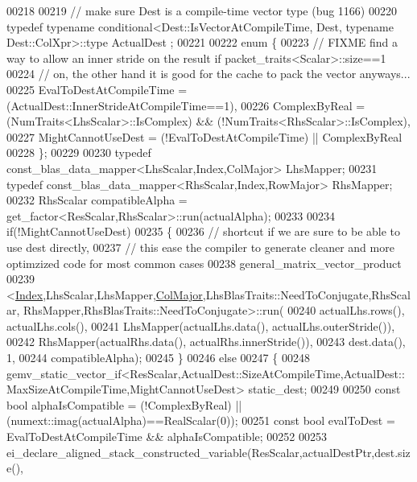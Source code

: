 \begin{DoxyCode}
00218 
00219     \textcolor{comment}{// make sure Dest is a compile-time vector type (bug 1166)}
00220     \textcolor{keyword}{typedef} \textcolor{keyword}{typename} conditional<Dest::IsVectorAtCompileTime, Dest, typename Dest::ColXpr>::type ActualDest
      ;
00221 
00222     \textcolor{keyword}{enum} \{
00223       \textcolor{comment}{// FIXME find a way to allow an inner stride on the result if packet\_traits<Scalar>::size==1}
00224       \textcolor{comment}{// on, the other hand it is good for the cache to pack the vector anyways...}
00225       EvalToDestAtCompileTime = (ActualDest::InnerStrideAtCompileTime==1),
00226       ComplexByReal = (NumTraits<LhsScalar>::IsComplex) && (!NumTraits<RhsScalar>::IsComplex),
00227       MightCannotUseDest = (!EvalToDestAtCompileTime) || ComplexByReal
00228     \};
00229 
00230     \textcolor{keyword}{typedef} const\_blas\_data\_mapper<LhsScalar,Index,ColMajor> LhsMapper;
00231     \textcolor{keyword}{typedef} const\_blas\_data\_mapper<RhsScalar,Index,RowMajor> RhsMapper;
00232     RhsScalar compatibleAlpha = get\_factor<ResScalar,RhsScalar>::run(actualAlpha);
00233 
00234     \textcolor{keywordflow}{if}(!MightCannotUseDest)
00235     \{
00236       \textcolor{comment}{// shortcut if we are sure to be able to use dest directly,}
00237       \textcolor{comment}{// this ease the compiler to generate cleaner and more optimzized code for most common cases}
00238       general\_matrix\_vector\_product
00239           <\hyperlink{namespace_eigen_a62e77e0933482dafde8fe197d9a2cfde}{Index},LhsScalar,LhsMapper,\hyperlink{group__enums_ggaacded1a18ae58b0f554751f6cdf9eb13a0cbd4bdd0abcfc0224c5fcb5e4f6669a}{ColMajor},LhsBlasTraits::NeedToConjugate,RhsScalar,
      RhsMapper,RhsBlasTraits::NeedToConjugate>::run(
00240           actualLhs.rows(), actualLhs.cols(),
00241           LhsMapper(actualLhs.data(), actualLhs.outerStride()),
00242           RhsMapper(actualRhs.data(), actualRhs.innerStride()),
00243           dest.data(), 1,
00244           compatibleAlpha);
00245     \}
00246     \textcolor{keywordflow}{else}
00247     \{
00248       
      gemv\_static\_vector\_if<ResScalar,ActualDest::SizeAtCompileTime,ActualDest::MaxSizeAtCompileTime,MightCannotUseDest> static\_dest;
00249 
00250       \textcolor{keyword}{const} \textcolor{keywordtype}{bool} alphaIsCompatible = (!ComplexByReal) || (numext::imag(actualAlpha)==RealScalar(0));
00251       \textcolor{keyword}{const} \textcolor{keywordtype}{bool} evalToDest = EvalToDestAtCompileTime && alphaIsCompatible;
00252 
00253       ei\_declare\_aligned\_stack\_constructed\_variable(ResScalar,actualDestPtr,dest.size(),

\end{DoxyCode}
